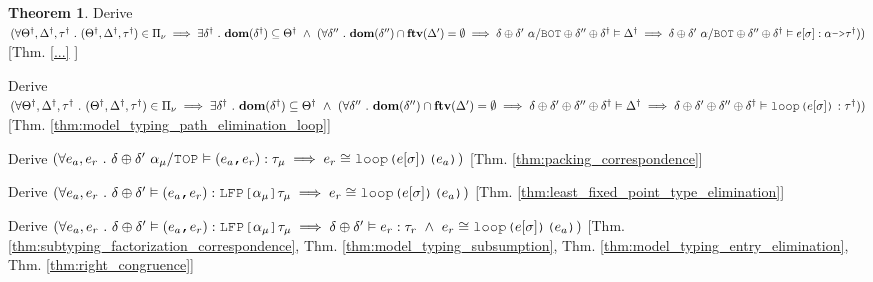 \documentclass[acmsmall]{acmart}
\theoremstyle{definition}
\newtheorem{theorem}{Theorem}[section]
\begin{document}
\begin{theorem}
  \item \I\I \N Derive $(
    \forall \Theta^\dagger, \Delta^\dagger, \tau^\dagger \qua 
    (\Theta^\dagger, \Delta^\dagger, \tau^\dagger) \in \Pi_\nu \implies
    \exists \delta^\dagger \qua \textbf{dom}(\delta^\dagger) \subseteq \Theta^\dagger \up 
    (
    \forall \delta'' \qua
    \textbf{dom}(\delta'') \cap \textbf{ftv}(\Delta') = \emptyset \implies
    \delta \oplus \delta'\ \alpha \slash \J{BOT} \oplus \delta'' \oplus \delta^\dagger \satisfies \Delta^\dagger \implies
    \delta \oplus \delta'\ \alpha \slash \J{BOT} \oplus \delta'' \oplus \delta^\dagger \satisfies e[\sigma] \hastype \alpha \J{->} \tau^\dagger
    )
  )$ [Thm. \ref{...} ]

  \item \I\I \N Derive $(
    \forall \Theta^\dagger, \Delta^\dagger, \tau^\dagger \qua 
    (\Theta^\dagger, \Delta^\dagger, \tau^\dagger) \in \Pi_\nu \implies
    \exists \delta^\dagger \qua \textbf{dom}(\delta^\dagger) \subseteq \Theta^\dagger \up 
    (
    \forall \delta'' \qua
    \textbf{dom}(\delta'') \cap \textbf{ftv}(\Delta') = \emptyset \implies
    \delta \oplus \delta' \oplus \delta'' \oplus \delta^\dagger \satisfies \Delta^\dagger \implies
    \delta \oplus \delta' \oplus \delta'' \oplus \delta^\dagger \satisfies \J{loop(}e[\sigma]\J{)} \hastype \tau^\dagger
    )
  )$ [Thm. \ref{thm:model_typing_path_elimination_loop}]

  \item \I\I \N Derive $(
    \forall e_a, e_r \qua 
    \delta \oplus \delta'\ \alpha_\mu \slash \J{TOP} \satisfies (e_a\J{,}e_r) \hastype \tau_\mu
    \implies 
    e_r \cong \J{loop(}e[\sigma]\J{)(} e_a \J{)}
  )$ [Thm. \ref{thm:packing_correspondence}]

  \item \I\I \N Derive $(
    \forall e_a, e_r \qua 
    \delta \oplus \delta' \satisfies (e_a\J{,}e_r) \hastype \J{LFP[}\alpha_\mu\J{]}\tau_\mu
    \implies 
    e_r \cong \J{loop(}e[\sigma]\J{)(} e_a \J{)}
  )$ [Thm. \ref{thm:least_fixed_point_type_elimination}]

  \item \I\I \N Derive $(
    \forall e_a, e_r \qua 
    \delta \oplus \delta' \satisfies (e_a\J{,}e_r) \hastype \J{LFP[}\alpha_\mu\J{]}\tau_\mu
    \implies 
    \delta \oplus \delta' \satisfies e_r \hastype \tau_r 
    \up
    e_r \cong \J{loop(}e[\sigma]\J{)(} e_a \J{)}
  )$ [Thm. \ref{thm:subtyping_factorization_correspondence},
      Thm. \ref{thm:model_typing_subsumption},
      Thm. \ref{thm:model_typing_entry_elimination},
      Thm. \ref{thm:right_congruence}]


\end{theorem}
\end{document}
